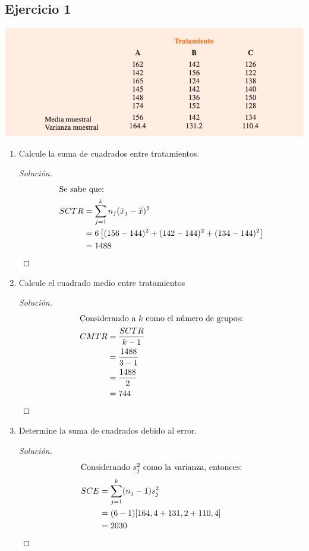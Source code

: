 \documentclass[a4paper,12pt]{article}
\newenvironment{solution}
  {\renewcommand\qedsymbol{$\blacksquare$}\begin{proof}[Solución]}
  {\end{proof}}
\begin{document}
\subsection{Ejercicio 1}
\begin{center}
    \includegraphics[scale=0.5]{Imagenes/1.png}
\end{center}
\begin{enumerate}
    \item  Calcule la suma de cuadrados entre tratamientos.
    \begin{solution}
    \begin{align}
        \intertext{Se sabe que: }
        SCTR &= \sum_{j=1}^k n_j(\Bar{x}_j-\Bar{\Bar{x}})^2\\
             &= 6\left[(156-144)^2+(142-144)^2+(134-144)^2\right]\\
             &= 1488
    \end{align}
    \end{solution}
    \item  Calcule el cuadrado medio entre tratamientos
    \begin{solution}
    \begin{align}
        \intertext{Considerando a $k$ como el número de grupos:}
        CMTR &= \frac{SCTR}{k-1}\\
             &= \frac{1488}{3-1}\\
             &= \frac{1488}{2}\\
             &= 744
    \end{align}
    \end{solution}
    \item  Determine la suma de cuadrados debido al error.
    \begin{solution}
    \begin{align}
        \intertext{Considerando $s_j^2$ como la varianza, entonces:}
        SCE &= \sum_{j=1}^k (n_j-1)s_j^2\\
            &= (6-1)[164,4+131,2+110,4]\\
            &= 2030
    \end{align}

\end{solution}
\end{enumerate}
\end{document}
